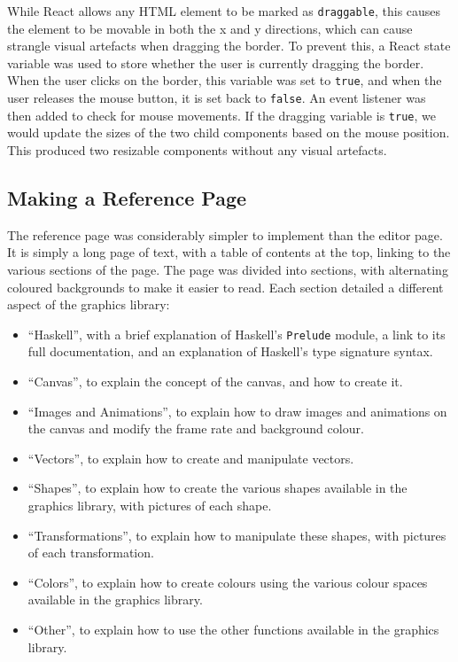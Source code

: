 \documentclass[../main.tex]{subfiles}
\begin{document}
            While React allows any HTML element to be marked as \texttt{draggable}, this
                causes the element to be movable in both the x and y directions, which can
                cause strangle visual artefacts when dragging the border.
            To prevent this, a React state variable was used to store whether the user is
                currently dragging the border.
            When the user clicks on the border, this variable was set to \texttt{true}, and
                when the user releases the mouse button, it is set back to \texttt{false}.
            An event listener was then added to check for mouse movements.
            If the dragging variable is \texttt{true}, we would update the sizes of the two
                child components based on the mouse position.
            This produced two resizable components without any visual artefacts.

        \subsection{Making a Reference Page}
            The reference page was considerably simpler to implement than the editor page.
            It is simply a long page of text, with a table of contents at the top, linking
                to the various sections of the page.
            The page was divided into sections, with alternating coloured backgrounds to
                make it easier to read.
            Each section detailed a different aspect of the graphics library:
            \begin{itemize}
                \item ``Haskell'', with a brief explanation of Haskell's \texttt{Prelude} module,
                      a link to its full documentation, and an explanation of Haskell's type
                      signature syntax.
                \item ``Canvas'', to explain the concept of the canvas, and how to create it.
                \item ``Images and Animations'', to explain how to draw images and animations on the
                      canvas and modify the frame rate and background colour.
                \item ``Vectors'', to explain how to create and manipulate vectors.
                \item ``Shapes'', to explain how to create the various shapes available in the
                      graphics library, with pictures of each shape.
                \item ``Transformations'', to explain how to manipulate these shapes, with pictures
                      of each transformation.
                \item ``Colors'', to explain how to create colours using the various colour spaces
                      available in the graphics library.
                \item ``Other'', to explain how to use the other functions available in the graphics
                      library.
            \end{itemize}
\end{document}
